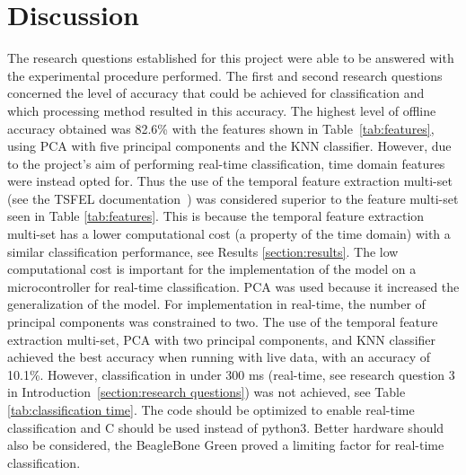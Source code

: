 \section{Discussion}
\label{section:disc}


The research questions established for this project were able to be answered with the experimental procedure performed.
The first and second research questions concerned the level of accuracy that could be achieved for classification and which processing method resulted in this accuracy.
The highest level of offline accuracy obtained was 82.6\% with the features shown in Table~\ref{tab:features}, using PCA with five principal components and the KNN classifier. 
However, due to the project's aim of performing real-time classification, time domain features were instead opted for. Thus the use of the temporal feature extraction multi-set (see the TSFEL documentation~\cite{barandas2020tsfel}) was considered superior to the feature multi-set seen in Table \ref{tab:features}. This is because the temporal feature extraction multi-set has a lower computational cost (a property of the time domain) with a similar classification performance, see Results \ref{section:results}. The low computational cost is important for the implementation of the model on a microcontroller for real-time classification. 
PCA was used because it increased the generalization of the model. For implementation in real-time, the number of principal components was constrained to two. 
The use of the temporal feature extraction multi-set, PCA with two principal components, and KNN classifier achieved the best accuracy when running with live data, with an accuracy of 10.1\%. 
However, classification in under 300 ms (real-time, see research question 3 in Introduction~\ref{section:research questions}) was not achieved, see Table \ref{tab:classification time}.
The code should be optimized to enable real-time classification and C should be used instead of python3. Better hardware should also be considered, the BeagleBone Green proved a limiting factor for real-time classification.
